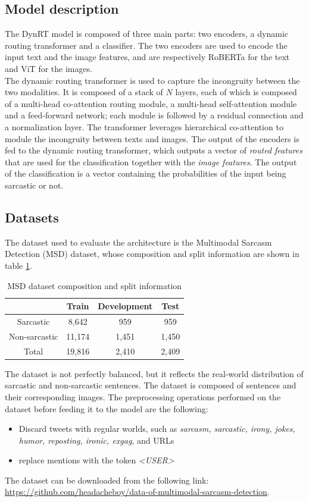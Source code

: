 \subsection{Model description}
The DynRT model is composed of three main parts: two encoders, a dynamic routing transformer and a classifier. The two encoders are used to encode the input text and the image features, and are respectively RoBERTa \cite{RoBERTa} for the text and ViT \cite{ViT} for the images. \\
The dynamic routing transformer is used to capture the incongruity between the two modalities. It is composed of a stack of $N$ layers, each of which is composed of a multi-head co-attention routing module, a multi-head self-attention module and a feed-forward network; each module is followed by a residual connection and a normalization layer. The transformer leverages hierarchical co-attention to module the incongruity between texts and images. The output of the encoders is fed to the dynamic routing transformer, which outputs a vector of \textit{routed features} that are used for the classification together with the \textit{image features}. The output of the classification is a vector containing the probabilities of the input being sarcastic or not. 

\subsection{Datasets}
The dataset used to evaluate the architecture is the Multimodal Sarcasm Detection (MSD) dataset, whose composition and split information are shown in table \ref{tab:MSD}.
\begin{table}
    \caption{MSD dataset composition and split information}
    \label{tab:MSD}
    \centering
    \begin{tabular}{|c c c c|}
        \hline
         & \textbf{Train} & \textbf{Development} & \textbf{Test} \\
        \hline
        Sarcastic & 8,642 & 959 & 959 \\
        Non-sarcastic & 11,174 & 1,451 & 1,450 \\
        Total & 19,816 & 2,410 & 2,409 \\
        \hline
    \end{tabular}
\end{table}
The dataset is not perfectly balanced, but it reflects the real-world distribution of sarcastic and non-sarcastic sentences. The dataset is composed of sentences and their corresponding images. The preprocessing operations performed on the dataset before feeding it to the model are the following:
\begin{itemize}
    \item Discard tweets with regular worlds, such as \textit{sarcasm, sarcastic, irony, jokes, humor, reposting, ironic, exgag}, and URLs
    \item replace mentions with the token \textit{<USER>}
\end{itemize}
The dataset can be downloaded from the following link: \\
\url{https://github.com/headacheboy/data-of-multimodal-sarcasm-detection}.


